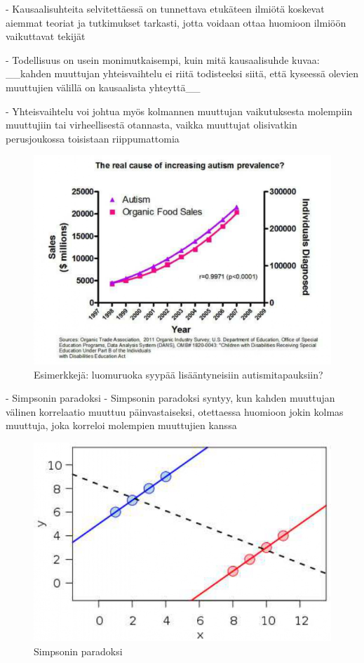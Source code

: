 \documentclass[
]{book}
\begin{document}
\begin{itemize}
- Kausaalisuhteita selvitettäessä on tunnettava etukäteen ilmiötä koskevat aiemmat teoriat ja tutkimukset tarkasti, jotta voidaan ottaa huomioon ilmiöön vaikuttavat tekijät

- Todellisuus on usein monimutkaisempi, kuin mitä kausaalisuhde kuvaa: __kahden muuttujan yhteisvaihtelu ei riitä todisteeksi siitä, että kyseessä olevien muuttujien välillä on kausaalista yhteyttä__

- Yhteisvaihtelu voi johtua myös kolmannen muuttujan vaikutuksesta molempiin muuttujiin tai virheellisestä otannasta, vaikka muuttujat olisivatkin perusjoukossa toisistaan riippumattomia

\begin{figure}
\includegraphics[width=14.47in]{images/causality2} \caption{Esimerkkejä: luomuruoka syypää lisääntyneisiin autismitapauksiin?}\label{fig:unnamed-chunk-15}
\end{figure}

- Simpsonin paradoksi
  - Simpsonin paradoksi syntyy, kun kahden muuttujan välinen korrelaatio muuttuu päinvastaiseksi, otettaessa huomioon jokin kolmas muuttuja, joka korreloi molempien muuttujien kanssa

\begin{figure}
\includegraphics[width=9.03in]{images/simpson} \caption{Simpsonin paradoksi}\label{fig:unnamed-chunk-16}
\end{figure}


\end{itemize}
\end{document}
